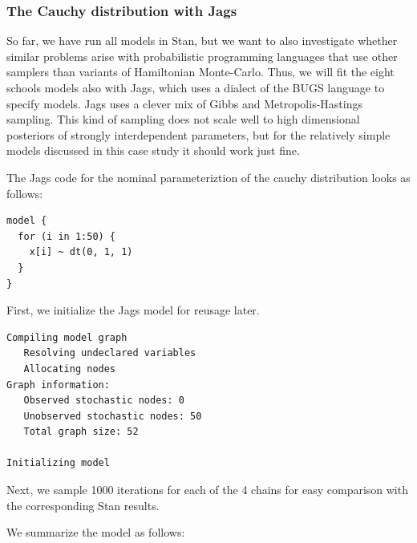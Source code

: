 \documentclass[american,]{article}
\begin{document}
\hypertarget{the-cauchy-distribution-with-jags}{%
\subsubsection*{The Cauchy distribution with
Jags}\label{the-cauchy-distribution-with-jags}}

So far, we have run all models in Stan, but we want to also investigate
whether similar problems arise with probabilistic programming languages
that use other samplers than variants of Hamiltonian Monte-Carlo. Thus,
we will fit the eight schools models also with Jags, which uses a
dialect of the BUGS language to specify models. Jags uses a clever mix
of Gibbs and Metropolis-Hastings sampling. This kind of sampling does
not scale well to high dimensional posteriors of strongly interdependent
parameters, but for the relatively simple models discussed in this case
study it should work just fine.

The Jags code for the nominal parameteriztion of the cauchy distribution
looks as follows:

\begin{verbatim}
model {
  for (i in 1:50) {
    x[i] ~ dt(0, 1, 1)
  }
}
\end{verbatim}

First, we initialize the Jags model for reusage later.

\begin{verbatim}
Compiling model graph
   Resolving undeclared variables
   Allocating nodes
Graph information:
   Observed stochastic nodes: 0
   Unobserved stochastic nodes: 50
   Total graph size: 52

Initializing model
\end{verbatim}

Next, we sample 1000 iterations for each of the 4 chains for easy
comparison with the corresponding Stan results.

We summarize the model as follows:
\end{document}
